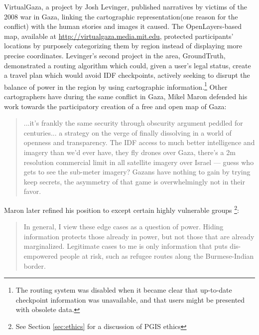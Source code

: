 \documentclass[11pt]{report}
\begin{document}
VirtualGaza, a project by Josh Levinger, published narratives by victims of the 2008 war in Gaza, linking the cartographic representation(one reason for the conflict) with the human stories and images it caused. The OpenLayers-based map, available at \url{http://virtualgaza.media.mit.edu}, protected participants' locations by purposely categorizing them by region instead of displaying more precise coordinates. Levinger's second project in the area, GroundTruth, demonstrated a routing algorithm which could, given a user's legal status, create a travel plan which would avoid IDF checkpoints, actively seeking to disrupt the balance of power in the region by using cartographic information.\footnote{The routing system was disabled when it became clear that up-to-date checkpoint information was unavailable, and that users might be presented with obsolete data.} Other cartographers have during the same conflict in Gaza, Mikel Maron defended his work towards the participatory creation of a free and open map of Gaza:  

\begin{quote}
...it's frankly the same security through obscurity argument peddled for centuries... a strategy on the verge of finally dissolving in a world of openness and transparency. The IDF access to much better intelligence and imagery than we'd ever have, they fly drones over Gaza, there's a 2m resolution commercial limit in all satellite imagery over Israel — guess who gets to see the sub-meter imagery? Gazans have nothing to gain by trying keep secrets, the asymmetry of that game is overwhelmingly not in their favor.\cite{maron2009misconceptions}
\end{quote}

Maron later refined his position to except certain highly vulnerable groups \footnote{See Section \ref{sec:ethics} for a discussion of PGIS ethics}:

\begin{quote}
In general, I view these edge cases as a question of power. Hiding information protects those already in power, but not those that are already marginalized. Legitimate cases to me is only information that puts dis-empowered people at risk, such as refugee routes along the Burmese-Indian border.\cite{maron2010freedom}
\end{quote}
\end{document}
